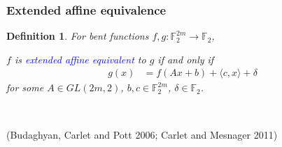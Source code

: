 \documentclass[pdf,sprung,slideColor,nocolorBG]{beamer}
\newenvironment{colortheme}[1]{
\def\ProvidesPackageRCS $##1${\relax}
\renewcommand{\ProcessOptions}{\relax}
\makeatletter

\makeatother
}{}
\newcommand{\slidecite}[1]{\tiny{(#1)}\normalsize{}}
\newcommand{\mb}[1]{\mathbb{#1}}
\newcommand{\Emph}[1]{\emph{\textcolor{blue}{#1}}}
\newcommand{\To}{\rightarrow}
\newcommand{\F}{\mb{F}}
\newtheorem{Def}{Definition}
\begin{document}

\begin{colortheme}{seagull}

\begin{frame}
\frametitle{Extended affine equivalence}

\begin{Def}
For bent functions $f,g : \F_2^{2m} \To \F_2$,

$f$ is \Emph{extended affine equivalent} to $g$ if and only if
\begin{align*}
g(x) &= f(A x + b) + \langle c, x \rangle + \delta
\end{align*}
for some $A \in GL(2m,2)$, $b, c \in \F_2^{2m}$, $\delta \in \F_2$.
\end{Def}
~

\slidecite{Budaghyan, Carlet and Pott 2006; Carlet and Mesnager 2011}
\end{frame}

\end{colortheme}
\end{document}
